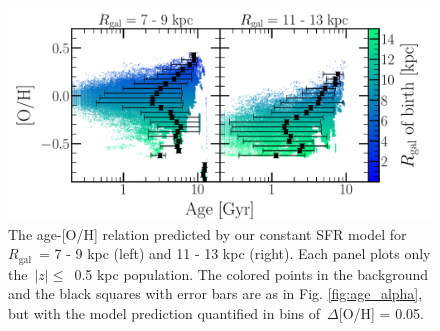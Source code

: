 \documentclass[draft2.tex]{subfiles}
\begin{document}
\begin{figure} 
\centering 
\includegraphics[scale = 0.35]{amr_static_o.pdf} 
\caption{The age-[O/H] relation predicted by our constant SFR model for 
$R_\text{gal}$~= 7 - 9 kpc (left) and 11 - 13 kpc (right). Each panel plots 
only the~$\left|z\right|\leq$~0.5 kpc population. The colored points in the 
background and the black squares with error bars are as in Fig. 
\ref{fig:age_alpha}, but with the model prediction quantified in bins 
of~$\Delta$[O/H] = 0.05. } 
\label{fig:age_oh_static} 
\end{figure} 
\end{document}
